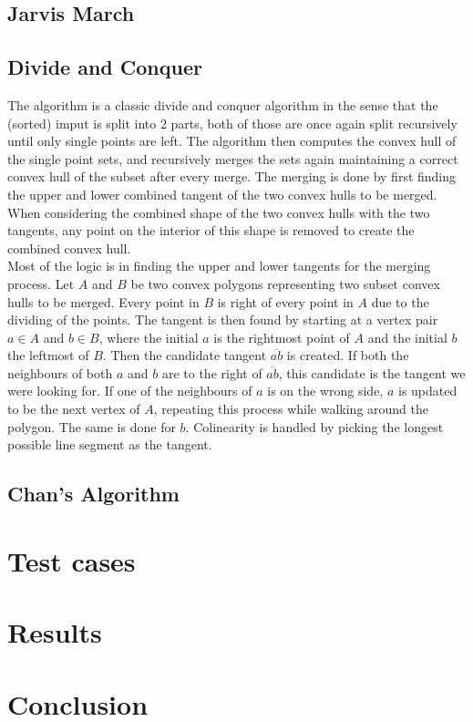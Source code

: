 \documentclass{article}
\begin{document}
\subsection*{Jarvis March}
\subsection*{Divide and Conquer}
The algorithm is a classic divide and conquer algorithm in the sense that the (sorted) imput is split into 2 parts, both of those are once again split recursively until only single points are left.
The algorithm then computes the convex hull of the single point sets, and recursively merges the sets again maintaining a correct convex hull of the subset after every merge.
The merging is done by first finding the upper and lower combined tangent of the two convex hulls to be merged.
When considering the combined shape of the two convex hulls with the two tangents, any point on the interior of this shape is removed to create the combined convex hull.
\\
Most of the logic is in finding the upper and lower tangents for the merging process.
Let $A$ and $B$ be two convex polygons representing two subset convex hulls to be merged. Every point in $B$ is right of every point in $A$ due to the dividing of the points.
The tangent is then found by starting at a vertex pair $a \in A$ and $b \in B$, where the initial $a$ is the rightmost point of $A$ and the initial $b$ the leftmost of $B$. 
Then the candidate tangent $\overline{ab}$ is created.
If both the neighbours of both $a$ and $b$ are to the right of $\overline{ab}$, this candidate is the tangent we were looking for. 
If one of the neighbours of $a$ is on the wrong side, $a$ is updated to be the next vertex of $A$, repeating this process while walking around the polygon. 
The same is done for $b$.
Colinearity is handled by picking the longest possible line segment as the tangent.
\subsection*{Chan's Algorithm}

\section*{Test cases}

\section*{Results}

\section*{Conclusion}
\end{document}
